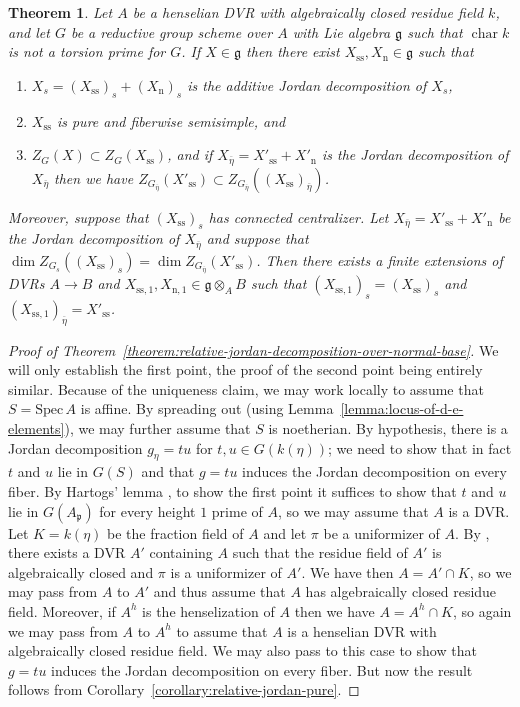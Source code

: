 \documentclass[11pt,reqno]{amsart}
\newtheorem{theorem}{Theorem}[section]
\theoremstyle{definition}
\renewcommand{\rm}{\mathrm}
\newcommand{\Spec}{\mathrm{Spec} \,}
\newcommand{\fg}{\mathfrak{g}}
\newcommand{\fp}{\mathfrak{p}}
\DeclareMathOperator{\chara}{char}
\begin{document}
\begin{theorem}\label{theorem:relative-additive-jordan-decomposition}
Let $A$ be a henselian DVR with algebraically closed residue field $k$, and let $G$ be a reductive group scheme over $A$ with Lie algebra $\fg$ such that $\chara k$ is not a torsion prime for $G$. If $X \in \fg$ then there exist $X_{\rm{ss}}, X_{\rm{n}} \in \fg$ such that
\begin{enumerate}
    \item $X_s = (X_{\rm{ss}})_s + (X_{\rm{n}})_s$ is the additive Jordan decomposition of $X_s$,
    \item $X_{\rm{ss}}$ is pure and fiberwise semisimple, and
    \item $Z_G(X) \subset Z_G(X_{\rm{ss}})$, and if $X_{\overline{\eta}} = X'_{\rm{ss}} + X'_{\rm{n}}$ is the Jordan decomposition of $X_{\overline{\eta}}$ then we have $Z_{G_{\overline{\eta}}}(X'_{\rm{ss}}) \subset Z_{G_{\overline{\eta}}}((X_{\rm{ss}})_{\overline{\eta}})$.
\end{enumerate}
Moreover, suppose that $(X_{\rm{ss}})_s$ has connected centralizer. Let $X_{\overline{\eta}} = X'_{\rm{ss}} + X'_{\rm{n}}$ be the Jordan decomposition of $X_{\overline{\eta}}$ and suppose that $\dim Z_{G_s}((X_{\rm{ss}})_s) = \dim Z_{G_{\overline{\eta}}}(X'_{\rm{ss}})$. Then there exists a finite extensions of DVRs $A \to B$ and $X_{\rm{ss}, 1}, X_{\rm{n}, 1} \in \fg \otimes_A B$ such that $(X_{\rm{ss}, 1})_s = (X_{\rm{ss}})_s$ and $(X_{\rm{ss}, 1})_{\overline{\eta}} = X'_{\rm{ss}}$.
\end{theorem}

\begin{proof}[Proof of Theorem~\ref{theorem:relative-jordan-decomposition-over-normal-base}]
We will only establish the first point, the proof of the second point being entirely similar. Because of the uniqueness claim, we may work locally to assume that $S = \Spec A$ is affine. By spreading out (using Lemma~\ref{lemma:locus-of-d-e-elements}), we may further assume that $S$ is noetherian. By hypothesis, there is a Jordan decomposition $g_{\eta} = tu$ for $t, u \in G(k(\eta))$; we need to show that in fact $t$ and $u$ lie in $G(S)$ and that $g = tu$ induces the Jordan decomposition on every fiber. By Hartogs' lemma \cite[Thm.\ 11.5]{Matsumura}, to show the first point it suffices to show that $t$ and $u$ lie in $G(A_{\fp})$ for every height $1$ prime of $A$, so we may assume that $A$ is a DVR. Let $K = k(\eta)$ be the fraction field of $A$ and let $\pi$ be a uniformizer of $A$. By \cite[0\textsubscript{III}, Prop.\ 10.3.1]{EGA}, there exists a DVR $A'$ containing $A$ such that the residue field of $A'$ is algebraically closed and $\pi$ is a uniformizer of $A'$. We have then $A = A' \cap K$, so we may pass from $A$ to $A'$ and thus assume that $A$ has algebraically closed residue field. Moreover, if $A^h$ is the henselization of $A$ then we have $A = A^h \cap K$, so again we may pass from $A$ to $A^h$ to assume that $A$ is a henselian DVR with algebraically closed residue field. We may also pass to this case to show that $g = tu$ induces the Jordan decomposition on every fiber. But now the result follows from Corollary~\ref{corollary:relative-jordan-pure}.
\end{proof}
\end{document}
